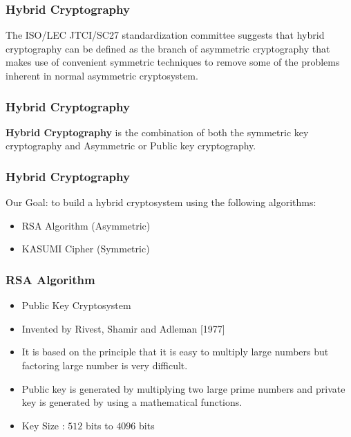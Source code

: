 \documentclass{beamer}
\begin{document}
\begin{frame}
\frametitle{Hybrid Cryptography}
 The ISO/LEC JTCI/SC27 standardization committee suggests that hybrid cryptography can be defined as the branch of asymmetric cryptography that makes use of convenient symmetric techniques to remove some of the problems inherent in normal asymmetric cryptosystem.
\end{frame}

\begin{frame}
\frametitle{Hybrid Cryptography}
\textbf{Hybrid Cryptography} is the combination of both the symmetric key cryptography and Asymmetric or Public key cryptography.
\end{frame}

\begin{frame}
	\frametitle{Hybrid Cryptography}
	Our Goal: to build a hybrid cryptosystem using the following algorithms:
	\vspace{0.2in}
	\begin{itemize}
		\item RSA Algorithm (Asymmetric)
		\item KASUMI Cipher (Symmetric)
	\end{itemize}
\end{frame}

\begin{frame}[t]
	\frametitle{RSA Algorithm}
	 \begin{itemize}
	 	\item Public Key Cryptosystem
	 	\item Invented by Rivest, Shamir and Adleman [1977]
	 	\item It is based on the principle that it is easy to multiply large numbers but factoring large number is very difficult.
	 	\item Public key is generated by multiplying two large prime numbers and private key is generated by using a mathematical functions.
	 	\item Key Size : $512$ bits to $4096$ bits
	 	 
	 \end{itemize}
\end{frame}
\end{document}
